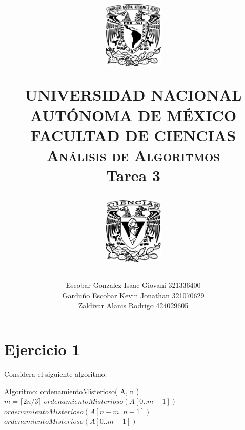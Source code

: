 \documentclass[12pt]{article}
\title{
		\vspace{-0.7in}
		\usefont{OT1}{bch}{b}{n}
		\begin{minipage}{3cm}
        \vspace{-0.5in}
    	\begin{center}
    		\includegraphics[height=3.2cm]{../logo_unam.png}
    	\end{center}
    \end{minipage}\hfill
    \begin{minipage}{10.7cm}

    	\begin{center}
\normalfont \normalsize \textsc{UNIVERSIDAD NACIONAL AUTÓNOMA DE MÉXICO \\ FACULTAD DE CIENCIAS \\ Análisis de Algoritmos } \\
		\huge Tarea 3
    	\end{center}

    \end{minipage}\hfill
    \begin{minipage}{3.2cm}
    \vspace{-0.5in}
    	\begin{center}
    		\includegraphics[height=3.2cm]{../logo_fc.png}
    	\end{center}
    \end{minipage}

\author{Escobar Gonzalez Isaac Giovani \hspace{1cm} 321336400\\
        Garduño Escobar Kevin Jonathan \hspace{0.5cm} 321070629\\
        Zaldivar Alanis Rodrigo \hspace{2.75cm} 424029605 }
\date{}
}
\begin{document}
\maketitle

\section*{Ejercicio 1}
Considera el siguiente algoritmo:\\
\LinesNumbered
\renewcommand{\algorithmcfname}{Algoritmo}
\begin{algorithm}[H]
    Algoritmo: ordenamientoMisterioso( A, n )\\
     {
        $m = \lceil 2n/3\rceil$\;
        $ordenamientoMisterioso(A[0 .. m-1])$ \;
        $ordenamientoMisterioso(A[n-m .. n-1])$ \;
        $ordenamientoMisterioso(A[0 .. m-1])$ \;
    }
\end{algorithm}
\end{document}
